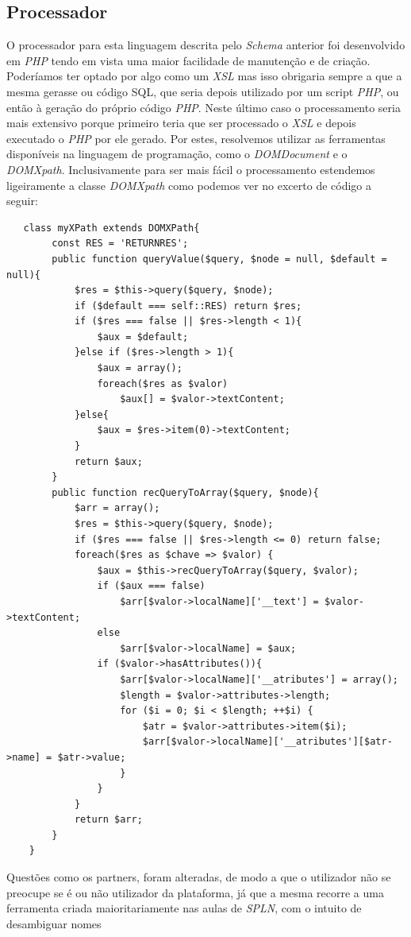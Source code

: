 \documentclass[a4paper,11pt,openright,openbib]{article}
\begin{document}
\subsection{Processador}
O processador para esta linguagem descrita pelo \emph{Schema} anterior foi desenvolvido em \emph{PHP} tendo em vista uma maior facilidade de manutenção e de criação. Poderíamos ter optado por algo como um \emph{XSL} mas isso obrigaria sempre a que a mesma gerasse ou código SQL, que seria depois utilizado por um script \emph{PHP}, ou então à geração do próprio código \emph{PHP}. Neste último caso o processamento seria mais extensivo porque primeiro teria que ser processado o \emph{XSL} e depois executado o \emph{PHP} por ele gerado. Por estes, resolvemos utilizar as ferramentas disponíveis na linguagem de programação, como o \emph{DOMDocument} e o \emph{DOMXpath}. Inclusivamente para ser mais fácil o processamento estendemos ligeiramente a classe \emph{DOMXpath} como podemos ver no excerto de código a seguir:
\begin{verbatim}
   class myXPath extends DOMXPath{
        const RES = 'RETURNRES';
        public function queryValue($query, $node = null, $default = null){
            $res = $this->query($query, $node);
            if ($default === self::RES) return $res;
            if ($res === false || $res->length < 1){
                $aux = $default;
            }else if ($res->length > 1){
                $aux = array();
                foreach($res as $valor)
                    $aux[] = $valor->textContent;
            }else{
                $aux = $res->item(0)->textContent;
            }
            return $aux;
        }
        public function recQueryToArray($query, $node){
            $arr = array();
            $res = $this->query($query, $node);
            if ($res === false || $res->length <= 0) return false;
            foreach($res as $chave => $valor) {
                $aux = $this->recQueryToArray($query, $valor);
                if ($aux === false)
                    $arr[$valor->localName]['__text'] = $valor->textContent;
                else 
                    $arr[$valor->localName] = $aux;
                if ($valor->hasAttributes()){
                    $arr[$valor->localName]['__atributes'] = array();
                    $length = $valor->attributes->length;
                    for ($i = 0; $i < $length; ++$i) {
                        $atr = $valor->attributes->item($i);
                        $arr[$valor->localName]['__atributes'][$atr->name] = $atr->value;  
                    }
                }
            }
            return $arr;
        }
    }
\end{verbatim}
Questões como os partners, foram alteradas, de modo a que o utilizador não se preocupe se é ou não utilizador da plataforma, já que a mesma recorre a uma ferramenta criada maioritariamente nas aulas de \emph{SPLN}, com o intuito de desambiguar nomes
\end{document}
